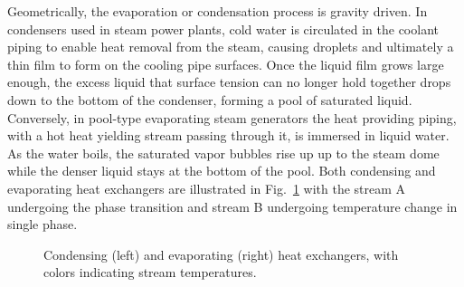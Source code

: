 Geometrically, the evaporation or condensation process is gravity driven. In condensers used in steam power plants, cold water is circulated in the coolant piping to enable heat removal from the steam, causing droplets and ultimately a thin film to form on the cooling pipe surfaces. Once the liquid film grows large enough, the excess liquid that surface tension can no longer hold together drops down to the bottom of the condenser, forming a pool of saturated liquid. Conversely, in pool-type evaporating steam generators the heat providing piping, with a hot heat yielding stream passing through it, is immersed in liquid water. As the water boils, the saturated vapor bubbles rise up up to the steam dome while the denser liquid stays at the bottom of the pool. Both condensing and evaporating heat exchangers are illustrated in Fig.~\ref{fig:condenser-evaporator} with the stream A undergoing the phase transition and stream B undergoing temperature change in single phase.
\begin{figure}[!htb]
    \centering
    
    \caption{Condensing (left) and evaporating (right) heat exchangers, with colors indicating stream temperatures.}
    \label{fig:condenser-evaporator}
\end{figure}

